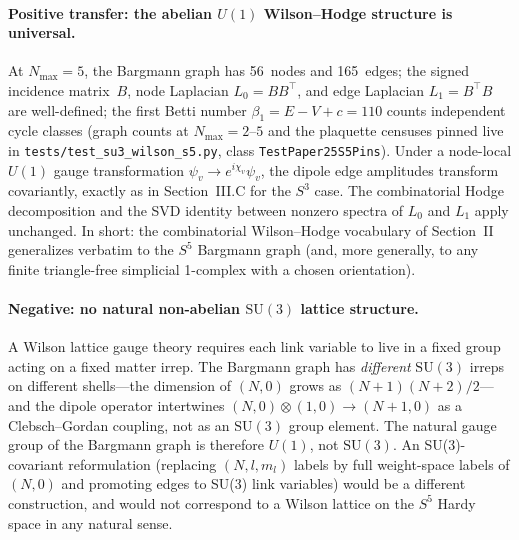 \documentclass[aps,pra,twocolumn,superscriptaddress,longbibliography]{revtex4-2}
\begin{document}
\paragraph*{Positive transfer: the abelian $U(1)$ Wilson--Hodge
structure is universal.} At $N_{\max} = 5$, the Bargmann graph has
56~nodes and 165~edges; the signed incidence matrix~$B$, node
Laplacian $L_0 = B B^{\top}$, and edge Laplacian
$L_1 = B^{\top} B$ are well-defined; the first Betti number
$\beta_1 = E - V + c = 110$ counts independent cycle
classes (graph counts at $N_{\max} = 2$--$5$ and the plaquette
censuses pinned live in \texttt{tests/test\_su3\_wilson\_s5.py},
class \texttt{TestPaper25S5Pins}).  Under a node-local $U(1)$ gauge transformation
$\psi_v \to e^{i\chi_v}\psi_v$, the dipole edge amplitudes transform
covariantly, exactly as in Section~III.C for the $S^3$ case.  The
combinatorial Hodge decomposition and the SVD identity between
nonzero spectra of $L_0$ and $L_1$ apply unchanged.  In short: the
combinatorial Wilson--Hodge vocabulary of Section~II generalizes
verbatim to the $S^5$ Bargmann graph (and, more generally, to any
finite triangle-free simplicial 1-complex with a chosen orientation).

\paragraph*{Negative: no natural non-abelian $\mathrm{SU}(3)$
lattice structure.} A Wilson lattice gauge theory requires each
link variable to live in a fixed group acting on a fixed matter
irrep.  The Bargmann graph has \emph{different} $\mathrm{SU}(3)$
irreps on different shells---the dimension of $(N, 0)$ grows as
$(N+1)(N+2)/2$---and the dipole operator intertwines
$(N, 0) \otimes (1, 0) \to (N+1, 0)$ as a Clebsch--Gordan
coupling, not as an $\mathrm{SU}(3)$ group element.  The natural
gauge group of the Bargmann graph is therefore $U(1)$, not
$\mathrm{SU}(3)$.  An SU(3)-covariant reformulation
(replacing $(N, l, m_l)$ labels by full weight-space labels of
$(N, 0)$ and promoting edges to SU(3) link variables) would be a
different construction, and would not correspond to a Wilson
lattice on the $S^5$ Hardy space in any natural sense.
\end{document}
